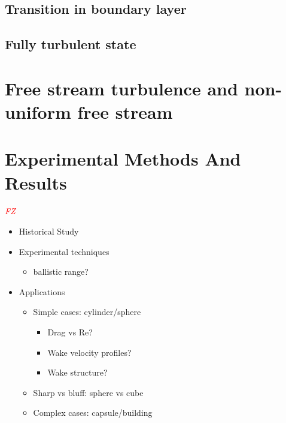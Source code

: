 \documentclass[journal]{new-aiaa}
\begin{document}
\subsection{Transition in boundary layer}


\subsection{Fully turbulent state}








\section{Free stream turbulence and non-uniform free stream}










\section{Experimental Methods And Results} \label{sec:experimentalmethods}

\textcolor{red}{\emph{FZ}}

\begin{itemize}
    \item Historical Study
    \item Experimental techniques
    \begin{itemize}
        \item ballistic range?
    \end{itemize}
    \item Applications
    \begin{itemize}
        \item Simple cases: cylinder/sphere
        \begin{itemize}
            \item Drag vs Re?
            \item Wake velocity profiles?
            \item Wake structure?
        \end{itemize}
        \item Sharp vs bluff: sphere vs cube
        \item Complex cases: capsule/building
    \end{itemize}
\end{itemize}
\end{document}
